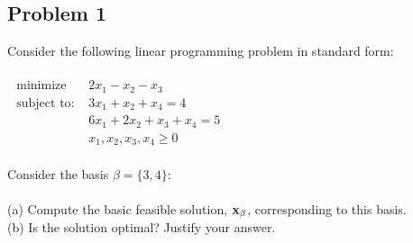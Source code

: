 \documentclass[12pt]{article}
\newcommand{\bfx}{{\bf x}}
\begin{document}
\newpage
\subsection*{Problem 1} 
Consider the following linear programming problem in standard form:
\\~\\$\begin{aligned} \text { minimize } & 2 x_{1}-x_{2}-x_{3} \\ \text { subject to: } & 3 x_{1}+x_{2}+x_{4}=4 \\ & 6 x_{1}+2 x_{2}+x_{3}+x_{4}=5 \\ & x_{1}, x_{2}, x_{3}, x_{4} \geq 0 \end{aligned}$
\\~\\Consider the basis $\beta=\{3, 4\}$:
\\~\\(a) Compute the basic feasible solution, $\bfx_\beta$, corresponding to this basis.
\\(b) Is the solution optimal? Justify your answer.
\end{document}
